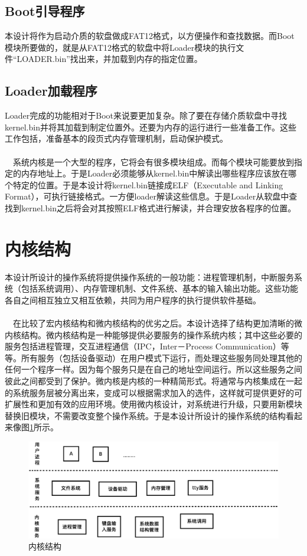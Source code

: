 \documentclass[UTF8,nofonts,cs4size]{ctexrep}
\begin{document}
\subsection{Boot引导程序}
本设计将作为启动介质的软盘做成FAT12格式，以方便操作和查找数据。而Boot模块所要做的，就是从FAT12格式的软盘中将Loader模块的执行文件“LOADER.bin”找出来，并加载到内存的指定位置。
\subsection{Loader加载程序}
Loader完成的功能相对于Boot来说要更加复杂。除了要在存储介质软盘中寻找kernel.bin并将其加载到制定位置外。还要为内存的运行进行一些准备工作。这些工作包括，准备基本的段页式内存管理机制，启动保护模式。
\paragraph{}
\indent \ \ 
系统内核是一个大型的程序，它将会有很多模块组成。而每个模块可能要放到指定的内存地址上。于是Loader必须能够从kernel.bin中解读出哪些程序应该放在哪个特定的位置。于是本设计将kernel.bin链接成ELF（Executable and Linking Format），可执行链接格式。一方便loader解读这些信息。于是Loader从软盘中查找到kernel.bin之后将会对其按照ELF格式进行解读，并合理安放各程序的位置。

\section{内核结构}
本设计所设计的操作系统将提供操作系统的一般功能：进程管理机制，中断服务系统（包括系统调用）、内存管理机制、文件系统、基本的输入输出功能。这些功能各自之间相互独立又相互依赖，共同为用户程序的执行提供软件基础。
\paragraph{}
\indent \ \ 
在比较了宏内核结构和微内核结构的优劣之后。本设计选择了结构更加清晰的微内核结构。微内核结构是一种能够提供必要服务的操作系统内核；其中这些必要的服务包括进程管理，交互进程通信（IPC，Inter－Process Communication）等等。所有服务（包括设备驱动）在用户模式下运行，而处理这些服务同处理其他的任何一个程序一样。因为每个服务只是在自己的地址空间运行。所以这些服务之间彼此之间都受到了保护。微内核是内核的一种精简形式。将通常与内核集成在一起的系统服务层被分离出来，变成可以根据需求加入的选件，这样就可提供更好的可扩展性和更加有效的应用环境。使用微内核设计，对系统进行升级，只要用新模块替换旧模块，不需要改变整个操作系统。于是本设计所设计的操作系统的结构看起来像图\ref{osstruct}所示。
\begin{figure}[htp]
\centering
\includegraphics[scale=0.38]{osstruct.eps}
\caption{内核结构}
\label{osstruct}
\end{figure}
\end{document}
